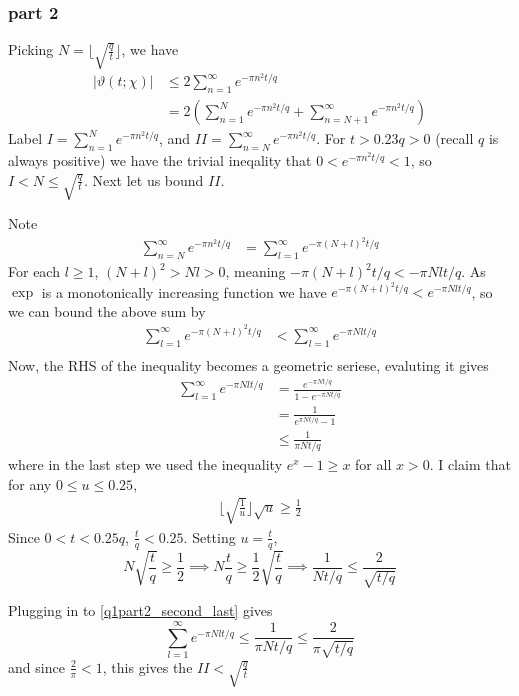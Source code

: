 \documentclass{article}
\theoremstyle{definition}
\theoremstyle{definition}
\theoremstyle{remark}
\renewcommand{\t}{\vartheta}
\newcommand{\x}{\chi}
\begin{document}
\subsubsection*{part 2}
Picking $N = \lfloor \sqrt{\frac{q}{t}}\rfloor$, we have
\begin{align}
	|\t(t; \x) |
	&\leq 2 \sum_{n = 1}^{\infty} e^{-\pi n^2 t/q}  \\
	& = 2 \left( \sum_{n = 1}^{N} e^{-\pi n^2 t/q}
	+ \sum_{n = N + 1}^{\infty} e^{-\pi n^2 t/q} \right)  \label{q1part2_I_II}
\end{align}
Label $I =  \sum_{n = 1}^{N} e^{-\pi n^2 t/q}$, and $II =  \sum_{n = N}^{\infty} e^{-\pi n^2 t/q}$.
For $t > 0.23 q > 0$ (recall $q$ is always positive) we have the trivial ineqality that $0 < e^{-\pi n^2 t / q} < 1$, so $I < N \leq \sqrt{\frac{q}{t}}$. 
Next let us bound $II$.

Note 
\begin{align}
	\sum_{n = N}^{\infty} e^{-\pi n^2 t/q} 
	&= \sum_{l = 1}^{\infty} e^{-\pi (N + l)^2 t/q} 
\end{align}
For each $l \geq 1$, $(N + l)^2 > Nl > 0$, meaning $-\pi (N + l)^2 t/q < -\pi Nl t/q$. 
As $\exp$ is a monotonically increasing function we have $e^{-\pi (N + l)^2 t/q} < e^{-\pi Nl t/q}$, so we can bound the above sum by
\begin{align}
	\sum_{l = 1}^{\infty} e^{-\pi (N + l)^2 t/q} 
	&< \sum_{l = 1}^{\infty} e^{-\pi Nl t/q} \\
\end{align}
Now, the RHS of the inequality becomes a geometric seriese, evaluting it gives 
\begin{align}
	\sum_{l = 1}^{\infty} e^{-\pi Nl t/q} 
	&= \frac{e^{-\pi N t/q}}{1 - e^{-\pi N t/q}} \\
	&= \frac{1}{e^{\pi N t/q} - 1} \\
	&\leq \frac{1}{\pi N t/q} \label{q1part2_second_last}
\end{align}
where in the last step we used the inequality $e^x - 1 \geq x$ for all $x > 0$.
I claim that for any $0 \leq u \leq 0.25$, 
\begin{align}\label{q1part2_key}
	\lfloor \sqrt{\frac{1}{u}}\rfloor \sqrt{u}  \geq \frac{1}{2}
\end{align}
Since $0 <t < 0.25 q$, $\frac{t}{q} < 0.25$.
Setting $u = \frac{t}{q}$,
$$
N \sqrt{\frac{t}{q}} \geq \frac{1}{2} \implies N \frac{t}{q} \geq \frac{1}{2} \sqrt{\frac{t}{q}} \implies \frac{1}{N t /q} \leq \frac{2}{\sqrt{t/q}}
$$

Plugging in to \eqref{q1part2_second_last} gives 
$$
\sum_{l = 1}^{\infty} e^{-\pi Nl t/q} \leq \frac{1}{\pi N t/q} \leq \frac{2}{\pi \sqrt{ t/q}}
$$
and since $\frac{2}{\pi} < 1$, this gives the $II < \sqrt{\frac{q}{t}}$
\end{document}

